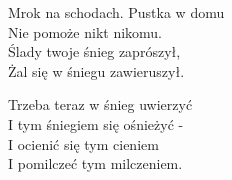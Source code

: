 \begin{text}
    Mrok na schodach. Pustka w domu\\
    Nie pomoże nikt nikomu.\\
    Ślady twoje śnieg zaprószył,\\
    Żal się w śniegu zawieruszył.

    Trzeba teraz w śnieg uwierzyć\\
    I tym śniegiem się ośnieżyć -\\
    I ocienić się tym cieniem\\
    I pomilczeć tym milczeniem.
\end{text}
\begin{chord}

\end{chord}